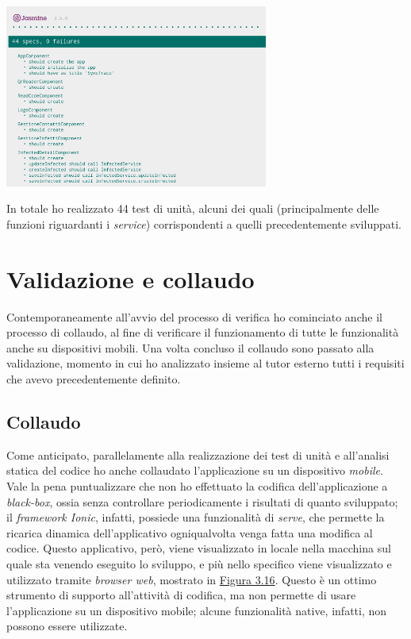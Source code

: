 \begin{minipage}{\linewidth}
  \label{img:jasminekarma}
  \centering
    \includegraphics[height=6cm]{immagini/jasminekarma}
\end{minipage}

In totale ho realizzato 44 test di unità, alcuni dei quali (principalmente delle funzioni riguardanti i \textit{service}) corrispondenti a quelli precedentemente sviluppati.


\section{Validazione e collaudo}

Contemporaneamente all'avvio del processo di verifica ho cominciato anche il processo di collaudo, al fine di verificare il funzionamento di tutte le funzionalità anche su dispositivi mobili. Una volta concluso il collaudo sono passato alla validazione, momento in cui ho analizzato insieme al tutor esterno tutti i requisiti che avevo precedentemente definito.

\subsection*{Collaudo}

Come anticipato, parallelamente alla realizzazione dei test di unità e all'analisi statica del codice ho anche collaudato l'applicazione su un dispositivo \textit{mobile}. Vale la pena puntualizzare che non ho effettuato la codifica dell'applicazione a \textit{black-box}, ossia senza controllare periodicamente i risultati di quanto sviluppato; il \textit{framework Ionic}, infatti, possiede una funzionalità di \textit{serve}, che permette la ricarica dinamica dell'applicativo ogniqualvolta venga fatta una modifica al codice. Questo applicativo, però, viene visualizzato in locale nella macchina sul quale sta venendo eseguito lo sviluppo, e più nello specifico viene visualizzato e utilizzato tramite \textit{browser web}, mostrato in \hyperref[img:ionicserve]{Figura 3.16}. Questo è un ottimo strumento di supporto all'attività di codifica, ma non permette di usare l'applicazione su un dispositivo mobile; alcune funzionalità native, infatti, non possono essere utilizzate. \\


